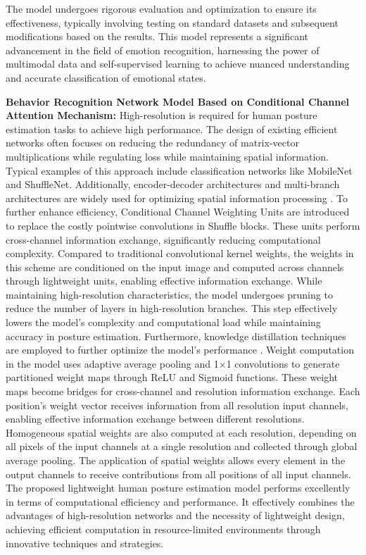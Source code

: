 \documentclass[preprint,12pt]{elsarticle}
\begin{document}
The model undergoes rigorous evaluation and optimization to ensure its effectiveness, typically involving testing on standard datasets and subsequent modifications based on the results. This model represents a significant advancement in the field of emotion recognition, harnessing the power of multimodal data and self-supervised learning to achieve nuanced understanding and accurate classification of emotional states.

\textbf{Behavior Recognition Network Model Based on Conditional Channel Attention Mechanism:} High-resolution is required for human posture estimation tasks to achieve high performance. The design of existing efficient networks often focuses on reducing the redundancy of matrix-vector multiplications while regulating loss while maintaining spatial information. Typical examples of this approach include classification networks like MobileNet and ShuffleNet. Additionally, encoder-decoder architectures and multi-branch architectures are widely used for optimizing spatial information processing \cite{ref45}. To further enhance efficiency, Conditional Channel Weighting Units are introduced to replace the costly pointwise convolutions in Shuffle blocks. These units perform cross-channel information exchange, significantly reducing computational complexity. Compared to traditional convolutional kernel weights, the weights in this scheme are conditioned on the input image and computed across channels through lightweight units, enabling effective information exchange. While maintaining high-resolution characteristics, the model undergoes pruning to reduce the number of layers in high-resolution branches. This step effectively lowers the model's complexity and computational load while maintaining accuracy in posture estimation. Furthermore, knowledge distillation techniques are employed to further optimize the model's performance \cite{ref46}. Weight computation in the model uses adaptive average pooling and 1×1 convolutions to generate partitioned weight maps through ReLU and Sigmoid functions. These weight maps become bridges for cross-channel and resolution information exchange. Each position's weight vector receives information from all resolution input channels, enabling effective information exchange between different resolutions. Homogeneous spatial weights are also computed at each resolution, depending on all pixels of the input channels at a single resolution and collected through global average pooling. The application of spatial weights allows every element in the output channels to receive contributions from all positions of all input channels. The proposed lightweight human posture estimation model performs excellently in terms of computational efficiency and performance. It effectively combines the advantages of high-resolution networks and the necessity of lightweight design, achieving efficient computation in resource-limited environments through innovative techniques and strategies.
\end{document}

